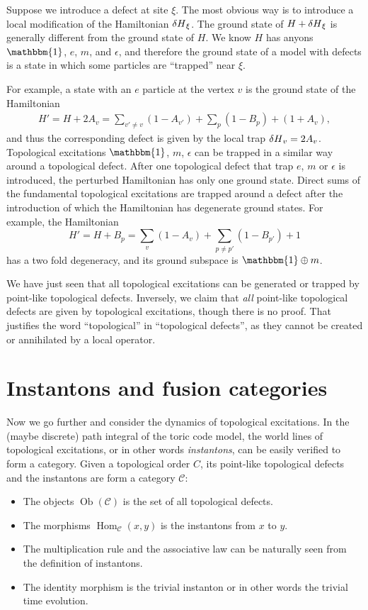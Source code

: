 \documentclass[hyperref, a4paper]{article}
\DeclareMathOperator{\object}{Ob}
\DeclareMathOperator{\morphism}{Hom}
\begin{document}
Suppose we introduce a defect at site $\xi$. The most obvious way is to introduce a local modification of the Hamiltonian $\var{H}_\xi$.
The ground state of $H+\var{H}_\xi$ is generally different from the ground state of $H$.
We know $H$ has anyons $\mathbbm{1}$, $e$, $m$, and $\epsilon$, and therefore the ground state of a model with defects is a state in which some particles are ``trapped'' near $\xi$.

For example, a state with an $e$ particle at the vertex $v$ is the ground state of the Hamiltonian
\begin{eqnarray}
    H' = H + 2 A_v = \sum_{v' \neq v} (1 - A_{v'}) + \sum_p (1 - B_p) + (1 + A_v),
\end{eqnarray}
and thus the corresponding defect is given by the local trap $\var{H}_v = 2 A_v$.
Topological excitations $\mathbbm{1}$, $m$, $\epsilon$ can be trapped in a similar way around a topological defect.
After one topological defect that trap $e$, $m$ or $\epsilon$ is introduced, the perturbed Hamiltonian has only one ground state.
Direct sums of the fundamental topological excitations are trapped around a defect after the introduction of which the Hamiltonian has degenerate ground states. 
For example, the Hamiltonian
\begin{equation}
    H' = H + B_p = \sum_v (1 - A_v) + \sum_{p \neq p'} (1 - B_{p'}) + 1
\end{equation}
has a two fold degeneracy, and its ground subspace is $\mathbbm{1} \oplus m$.

We have just seen that all topological excitations can be generated or trapped by point-like topological defects.
Inversely, we claim that \emph{all} point-like topological defects are given by topological excitations, though there is no proof.
That justifies the word ``topological'' in ``topological defects'', as they cannot be created or annihilated by a local operator.

\section{Instantons and fusion categories}

Now we go further and consider the dynamics of topological excitations. 
In the (maybe discrete) path integral of the toric code model, the world lines of topological excitations, or in other words \emph{instantons}, can be easily verified to form a category.
Given a topological order $C$, its point-like topological defects and the instantons are form a category $\mathcal{C}$:
\begin{itemize}
    \item The objects $\object(\mathcal{C})$ is the set of all topological defects.
    \item The morphisms $\morphism_\mathcal{C}(x, y)$ is the instantons from $x$ to $y$.
    \item The multiplication rule and the associative law can be naturally seen from the definition of instantons.
    \item The identity morphism is the trivial instanton or in other words the trivial time evolution. 
\end{itemize}
\end{document}
